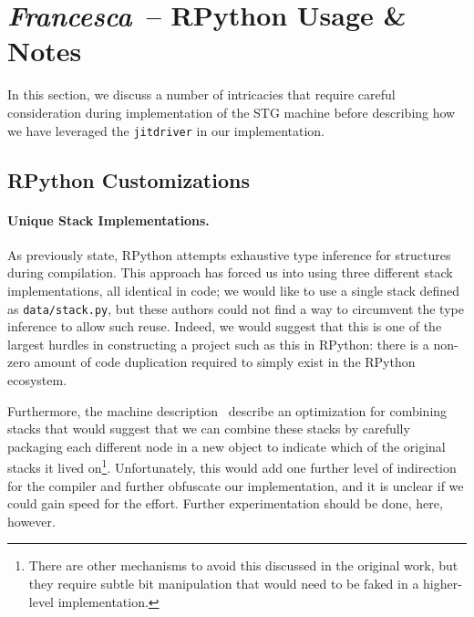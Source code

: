 \documentclass[preprint]{sigplanconf}
\begin{document}
\section{\emph{Francesca}~-- RPython Usage \& Notes} %

In this section, we discuss a number of intricacies that require careful
consideration during implementation of the STG machine before describing
how we have leveraged the \lstinline{jitdriver} in our implementation.

\subsection{RPython Customizations}



\paragraph{Unique Stack Implementations.}\label{sec:typeinf}
As previously state, RPython attempts exhaustive type inference for structures
during compilation. This approach has forced us into using three different
stack implementations, all identical in code; we would like to use a single
stack defined as \lstinline{data/stack.py}, but these authors could not find
a way to circumvent the type inference to allow such reuse.
Indeed, we would suggest that this is one of the largest
hurdles in constructing a project such as this in RPython: there is a non-zero
amount of code duplication required to simply exist in the RPython ecosystem.

Furthermore, the machine description~\cite{spj:stgmachine} describe an
optimization for combining stacks that would suggest that we can combine these
stacks by carefully packaging each different node in a new object to indicate
which of the original stacks it lived on\footnote{There are other mechanisms to
avoid this discussed in the original work, but they require subtle bit
manipulation that would need to be faked in a higher-level implementation.}. 
Unfortunately, this would add one further level of indirection for the compiler
and further obfuscate our implementation, and it is unclear if we could gain
speed for the effort.  Further experimentation should be done, here, however.  
\end{document}
